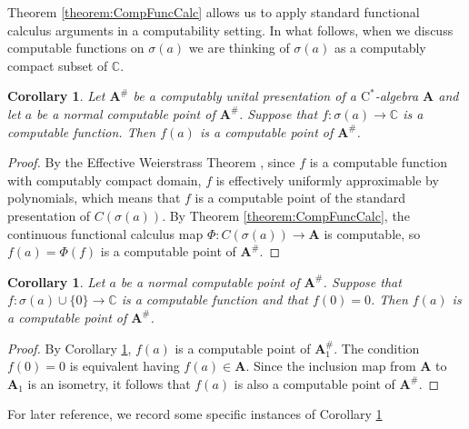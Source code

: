 \documentclass{amsart}
\newcommand{\boldA}{\mathbf{A}}
\newcommand{\cstar}{$\mathrm{C}^*$}
\theoremstyle{plain}
\newtheorem{corollary}[theorem]{Corollary}
\theoremstyle{definition}
\numberwithin{equation}{section}
\begin{document}
Theorem \ref{theorem:CompFuncCalc} allows us to apply standard functional calculus arguments in a computability setting.  In what follows, when we discuss computable functions on $\sigma(a)$ we are thinking of $\sigma(a)$ as a computably compact subset of $\mathbb{C}$.

\begin{corollary}\label{corollary:ApplyingFuncCalcUnital}
Let $\boldA^\#$ be a computably unital presentation of a \cstar-algebra $\boldA$ and let $a$ be a normal computable point of $\boldA^\#$.  Suppose that $f : \sigma(a) \to \mathbb{C}$ is a computable function.  Then $f(a)$ is a computable point of $\boldA^\#$.
\end{corollary}
\begin{proof}
By the Effective Weierstrass Theorem \cite[Theorem I.0.6]{PourElRichards.1989}, since $f$ is a computable function with computably compact domain, $f$ is effectively uniformly approximable by polynomials, which means that $f$ is a computable point of the standard presentation of $C(\sigma(a))$.  By Theorem \ref{theorem:CompFuncCalc}, the continuous functional calculus map $\Phi : C(\sigma(a)) \to \boldA$ is computable, so $f(a) = \Phi(f)$ is a computable point of $\boldA^\#$.
\end{proof}

\begin{corollary}\label{corollary:ApplyingFuncCalc}
Let $a$ be a normal computable point of $\boldA^\#$.  Suppose that $f : \sigma(a) \cup \{0\} \to \mathbb{C}$ is a computable function and that $f(0) = 0$.  Then $f(a)$ is a computable point of $\boldA^\#$.
\end{corollary}
\begin{proof}
By Corollary \ref{corollary:ApplyingFuncCalcUnital}, $f(a)$ is a computable point of $\boldA_1^\#$.  The condition $f(0) = 0$ is equivalent having $f(a) \in \boldA$.  Since the inclusion map from $\boldA$ to $\boldA_1$ is an isometry, it follows that $f(a)$ is also a computable point of $\boldA^\#$.
\end{proof}

For later reference, we record some specific instances of Corollary \ref{corollary:ApplyingFuncCalc}
\end{document}
